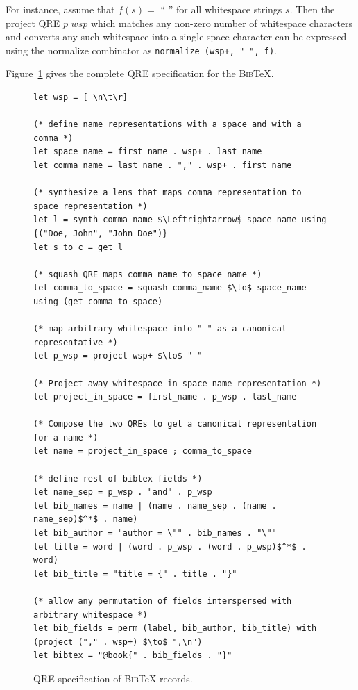 \documentclass[acmsmall,review,anonymous]{acmart}
\newcommand{\kw}[1]{\ensuremath{\mathit{#1}}}
\newcommand{\bibtex}{\textsc{Bib}\TeX{}}
\begin{document}
For instance, assume that $f(s)=$ `` '' for all whitespace strings $s$. Then the
project QRE \kw{p\_wsp} which matches any non-zero number of whitespace
characters and converts any such whitespace into a single space character can
be expressed using the normalize combinator as 
\lstinline{normalize (wsp+, " ", f)}.

Figure~\ref{fig:example-qre} gives the complete QRE specification for the
\bibtex{}.
\begin{figure}
\begin{lstlisting}
let wsp = [ \n\t\r]

(* define name representations with a space and with a comma *)
let space_name = first_name . wsp+ . last_name
let comma_name = last_name . "," . wsp+ . first_name

(* synthesize a lens that maps comma representation to space representation *)
let l = synth comma_name $\Leftrightarrow$ space_name using {("Doe, John", "John Doe")}
let s_to_c = get l

(* squash QRE maps comma_name to space_name *)
let comma_to_space = squash comma_name $\to$ space_name using (get comma_to_space)

(* map arbitrary whitespace into " " as a canonical representative *)
let p_wsp = project wsp+ $\to$ " "

(* Project away whitespace in space_name representation *)
let project_in_space = first_name . p_wsp . last_name

(* Compose the two QREs to get a canonical representation for a name *)
let name = project_in_space ; comma_to_space

(* define rest of bibtex fields *)
let name_sep = p_wsp . "and" . p_wsp
let bib_names = name | (name . name_sep . (name . name_sep)$^*$ . name)
let bib_author = "author = \"" . bib_names . "\""
let title = word | (word . p_wsp . (word . p_wsp)$^*$ . word)
let bib_title = "title = {" . title . "}"

(* allow any permutation of fields interspersed with arbitrary whitespace *)
let bib_fields = perm (label, bib_author, bib_title) with (project ("," . wsp+) $\to$ ",\n")
let bibtex = "@book{" . bib_fields . "}"
\end{lstlisting}
\caption{QRE specification of \bibtex{} records. }
\label{fig:example-qre}
\end{figure}
\end{document}
